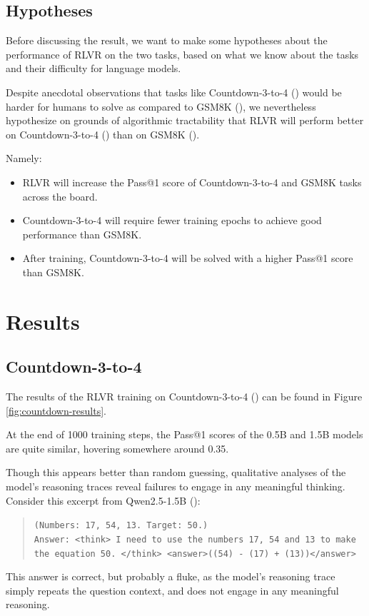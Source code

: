 \documentclass{article} %
\theoremstyle{definition}
\begin{document}
\subsection{Hypotheses}
\label{sec:hypotheses}
Before discussing the result, we want to make some hypotheses about the performance of RLVR on the two tasks,
based on what we know about the tasks and their difficulty for language models.

Despite anecdotal observations that tasks like Countdown-3-to-4 (\cite{countdown}) would 
be harder for humans to solve as compared to GSM8K (\cite{gsm8k}), we nevertheless hypothesize
on grounds of algorithmic tractability that RLVR will perform better on Countdown-3-to-4 (\cite{countdown}) than on GSM8K (\cite{gsm8k}).

Namely:
\begin{itemize}
    \item RLVR will increase the Pass@1 score of Countdown-3-to-4 and GSM8K tasks across the board.
    \item Countdown-3-to-4 will require fewer training epochs to achieve good performance than GSM8K.
    \item After training, Countdown-3-to-4 will be solved with a higher Pass@1 score than GSM8K.
\end{itemize}

\section{Results}

\subsection{Countdown-3-to-4}

The results of the RLVR training on Countdown-3-to-4 (\cite{countdown}) can be found in Figure \ref{fig:countdown-results}.

At the end of 1000 training steps, the Pass@1 scores of the 0.5B and 1.5B models 
are quite similar, hovering somewhere around 0.35. 

Though this appears better than random guessing, qualitative analyses of the model's 
reasoning traces reveal failures to engage in any meaningful thinking. 
Consider this excerpt from Qwen2.5-1.5B (\cite{Qwen-et-al-2025}):
\begin{quote}
    \texttt{(Numbers: 17, 54, 13. Target: 50.)} \\
    \texttt{Answer: <think> I need to use the numbers 17, 54 and 13 to make the equation 50. </think>
<answer>((54) - (17) + (13))</answer>}
\end{quote}
This answer is correct, but probably a fluke, as the model's reasoning trace 
simply repeats the question context, and does not engage in any meaningful reasoning.
\end{document}
